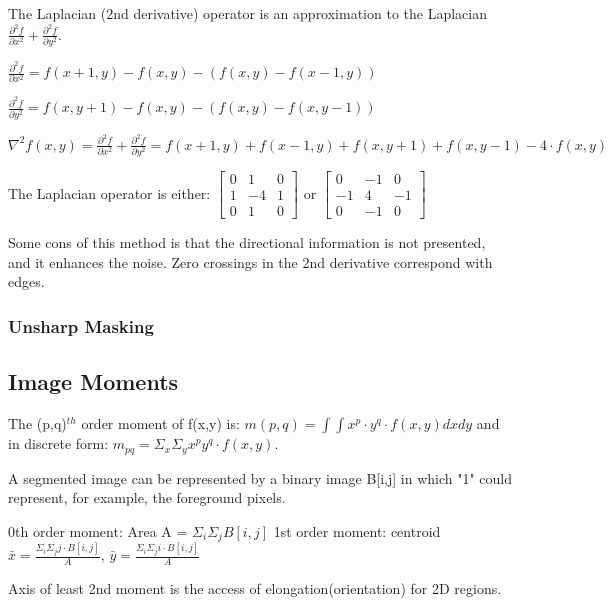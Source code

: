 \documentclass{article}
\begin{document}
\begin{multicols}{2}
The Laplacian (2nd derivative) operator is an approximation to the Laplacian $\frac{\partial^2f}{\partial x^2} + \frac{\partial^2f}{\partial y^2}$.

$\frac{\partial^2f}{\partial x^2} = f(x+1,y) - f(x,y) - (f(x,y) - f(x-1,y))$

$\frac{\partial^2f}{\partial y^2} = f(x,y+1) - f(x,y) - (f(x,y) - f(x,y-1))$

$\nabla^2 f(x,y) = \frac{\partial^2f}{\partial x^2} + \frac{\partial^2f}{\partial y^2} = f(x+1,y) + f(x-1,y) + f(x,y+1) + f(x,y-1) - 4 \cdot f(x,y)$

The Laplacian operator is either:
$
\begin{bmatrix}
  0 & 1 & 0\\
  1 & -4 & 1\\
  0 & 1 & 0
\end{bmatrix}
$
or
$
\begin{bmatrix}
  0 & -1 & 0\\
  -1 & 4 & -1\\
  0 & -1 & 0
\end{bmatrix}
$

Some cons of this method is that the directional information is not presented, and it enhances the noise. Zero crossings in the 2nd derivative correspond with edges.

\subsubsection{Unsharp Masking}



\subsection{Image Moments}

The (p,q)$^{th}$ order moment of f(x,y) is:
$m(p,q) = \int \int x^p \cdot y^q \cdot f(x,y) dxdy$
and in discrete form:
$m_{pq} = \Sigma_x \Sigma_y x^p y^q \cdot f(x,y)$.

A segmented image can be represented by a binary image B[i,j] in which "1" could represent, for example, the foreground pixels.

0th order moment: Area A = $\Sigma_i \Sigma_j B[i,j]$
1st order moment: centroid
$\bar x = \frac{\Sigma_i \Sigma_j j \cdot B[i,j]}{A}$,
$\bar y = \frac{\Sigma_i \Sigma_j i \cdot B[i,j]}{A}$

Axis of least 2nd moment is the access of elongation(orientation) for 2D regions.


\end{multicols}
\end{document}
